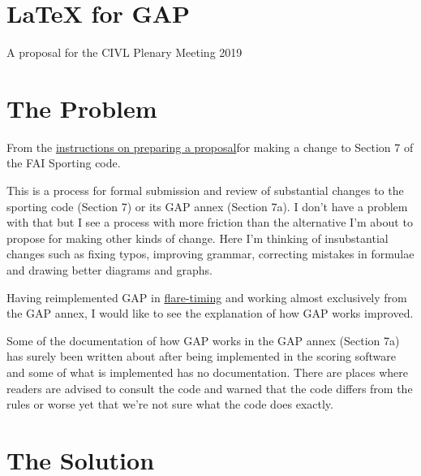 \documentclass{article}
\begin{document}
\section*{LaTeX for GAP}

A proposal for the CIVL Plenary Meeting 2019

\section{The Problem}


From the \href{https://www.fai.org/news/civl-plenary-2019}{instructions on
preparing a proposal}for making a change to Section 7 of the FAI Sporting code.

This is a process for formal submission and review of substantial changes to
the sporting code (Section 7) or its GAP annex (Section 7a). I don't have
a problem with that but I see a process with more friction than the alternative
I'm about to propose for making other kinds of change. Here I'm thinking of
insubstantial changes such as fixing typos, improving grammar, correcting
mistakes in formulae and drawing better diagrams and graphs.

Having reimplemented GAP in
\href{https://github.com/BlockScope/flare-timing}{flare-timing} and working
almost exclusively from the GAP annex, I would like to see the explanation of
how GAP works improved.

Some of the documentation of how GAP works in the GAP annex (Section 7a) has
surely been written about after being implemented in the scoring software and
some of what is implemented has no documentation.  There are places where
readers are advised to consult the code and warned that the code differs from
the rules or worse yet that we're not sure what the code does exactly.

\section{The Solution}
\end{document}
